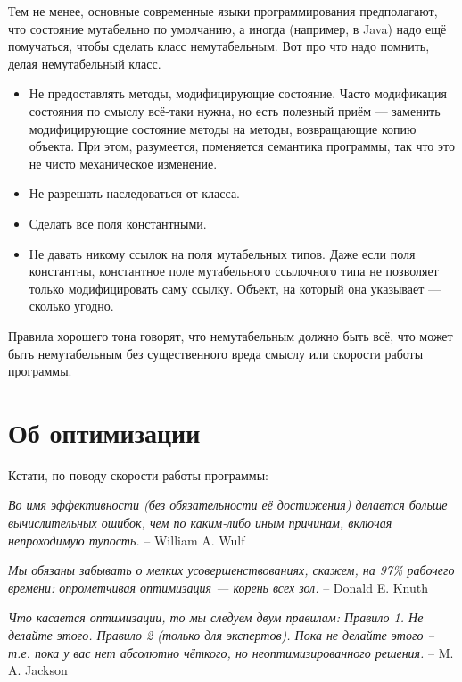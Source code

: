 \documentclass[a5paper]{article}
\begin{document}
Тем не менее, основные современные языки программирования предполагают, что состояние мутабельно по умолчанию, а иногда (например, в Java) надо ещё помучаться, чтобы сделать класс немутабельным. Вот про что надо помнить, делая немутабельный класс.

\begin{itemize}
    \item Не предоставлять методы, модифицирующие состояние. Часто модификация состояния по смыслу всё-таки нужна, но есть полезный приём --- заменить модифицирующие состояние методы на методы, возвращающие копию объекта. При этом, разумеется, поменяется семантика программы, так что это не чисто механическое изменение.
    \item Не разрешать наследоваться от класса.
    \item Сделать все поля константными.
    \item Не давать никому ссылок на поля мутабельных типов. Даже если поля константны, константное поле мутабельного ссылочного типа не позволяет только модифицировать саму ссылку. Объект, на который она указывает --- сколько угодно.
\end{itemize}

Правила хорошего тона говорят, что немутабельным должно быть всё, что может быть немутабельным без существенного вреда смыслу или скорости работы программы.

\section{Об оптимизации}

Кстати, по поводу скорости работы программы:

\textit{Во имя эффективности (без обязательности её достижения) делается больше вычислительных ошибок, чем по каким-либо иным причинам, включая непроходимую тупость.} \newline
-- William A. Wulf 

\textit{Мы обязаны забывать о мелких усовершенствованиях, ска­жем, на 97\% рабочего времени: опрометчивая оптимизация --- корень всех зол.} \newline
-- Donald E. Knuth

\textit{Что касается оптимизации, то мы следуем двум правилам: \newline
Правило 1. Не делайте этого. \newline
Правило 2 (только для экспертов). Пока не делайте этого -- т.е. пока у вас нет абсолютно чёткого, но неоптимизированного решения.} \newline
-- M. A. Jackson
\end{document}
